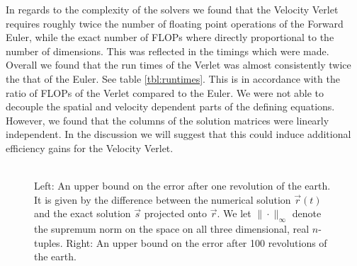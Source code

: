 \documentclass[11pt,english,a4paper]{article}
\begin{document}
In regards to the complexity of the solvers we found that the Velocity Verlet requires roughly twice the number of floating point operations of the Forward Euler, while the exact number of FLOPs where directly proportional to the number of dimensions. This was reflected in the timings which were made. Overall we found that the run times of the Verlet was almost consistently twice the that of the Euler. See table \ref{tbl:runtimes}. This is in accordance with the ratio of FLOPs of the Verlet compared to the Euler. We were not able to decouple the spatial and velocity dependent parts of the defining equations. However, we found that the columns of the solution matrices were linearly independent. In the discussion we will suggest that this could induce additional efficiency gains for the Velocity Verlet.\\
\\
\begin{figure}
%
\caption{Left: An upper bound on the error after one revolution of the earth. It is given by the difference between the numerical solution $\vec{r}(t)$ and the exact solution $\vec{s}$ projected onto $\vec{r}$. We let $\|\cdot\|_\infty$ denote the supremum norm on the space on all three dimensional, real $n$-tuples. Right: An upper bound on the error after 100 revolutions of the earth.}\label{fig:stableearthsun}
\end{figure}
\end{document}
